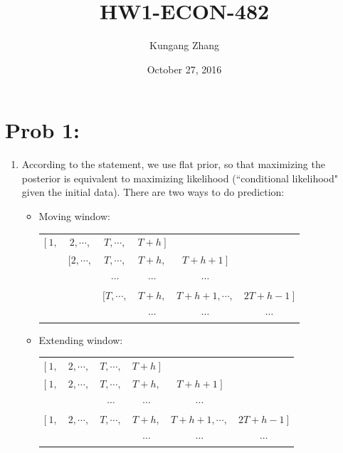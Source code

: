 \documentclass[11pt, oneside]{article}   	%
\title{HW1-ECON-482}
\author{Kungang Zhang}
\date{October 27, 2016}							%
\begin{document}
\maketitle
\section{Prob 1:}
\begin{enumerate}[(1)]
\item
According to the statement, we use flat prior, so that maximizing the posterior is equivalent to maximizing likelihood (``conditional likelihood" given the initial data). There are two ways to do prediction:
\begin{itemize}
\item
Moving window:
\begin{table}[!ht]
\center
\captionsetup{width=0.8\textwidth}
\begin{tabularx}{0.8\textwidth}{c c c c c c} 
 $[~1,$ & $2,\cdots,$ & $T,\cdots,$ & $T+h~]$ & &\\  
 & $[2,\cdots,$ & $T,\cdots,$ & $T+h,$ & $T+h+1~]$ &\\
 & & $\cdots$ & $\cdots$& $\cdots$& \\
 & & $[T,\cdots,$ & $T+h,$ & $T+h+1,\cdots,$ & $2T+h-1~]$ \\ 
 & & & $\cdots$ & $\cdots$& $\cdots$\\
 \end{tabularx} 
\end{table}
\item
Extending window:
\begin{table}[!ht]
\center
\captionsetup{width=0.8\textwidth}
\begin{tabularx}{0.8\textwidth}{c c c c c c} 
 $[~1,$ & $2,\cdots,$ & $T,\cdots,$ & $T+h~]$ & &\\  
 $[~1,$ & $2,\cdots,$ & $T,\cdots,$ & $T+h,$ & $T+h+1~]$ &\\
 & & $\cdots$ & $\cdots$& $\cdots$& \\
 $[~1,$ & $2,\cdots,$ & $T,\cdots,$ & $T+h,$ & $T+h+1,\cdots,$ & $2T+h-1~]$ \\ 
 & & & $\cdots$ & $\cdots$& $\cdots$\\
 \end{tabularx} 
\end{table}
\end{itemize}


\end{enumerate}
\end{document}
